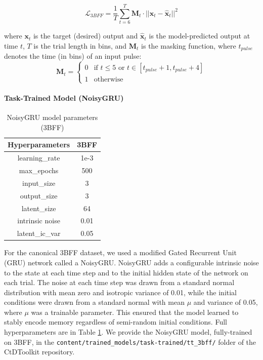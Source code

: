 \documentclass{article}
\begin{document}
$$\mathcal{L}_{3BFF} = \frac{1}{T} \sum_{t=6}^{T} \mathbf{M}_t \cdot ||\mathbf{x}_t - \mathbf{\hat{x}}_t||^2$$

where $\mathbf{x}_t$ is the target (desired) output and $\hat{\mathbf{x}}_t$ is the model-predicted output at time $t$, $T$ is the trial length in bins, and $\mathbf{M}_t$ is the masking function, where $t_{pulse}$ denotes the time (in bins) of an input pulse:
$$\mathbf{M}_t = \begin{cases}
0 & \text{if } t \leq 5 \text{ or } t \in [t_{pulse} + 1, t_{pulse} + 4] \\
1 & \text{otherwise}
\end{cases}$$

\paragraph{Task-Trained Model (NoisyGRU) \label{NoisyGRU}}
\begin{table}[ht]
\centering
\begin{tabular}{|c|c|}
\hline
\textbf{Hyperparameters} & \textbf{3BFF} \\ \hline
learning\_rate &  1e-3  \\ \hline
max\_epochs &  500  \\ \hline
input\_size & 3 \\ \hline
output\_size & 3 \\ \hline
latent\_size & 64 \\ \hline
intrinsic noise &  0.01 \\ \hline
latent\_ic\_var & 0.05  \\ \hline
\end{tabular}
\caption{NoisyGRU model parameters (3BFF)}
\label{table:3bffGRU}
\end{table}
For the canonical 3BFF dataset, we used a modified Gated Recurrent Unit (GRU) network called a NoisyGRU. NoisyGRU adds a configurable intrinsic noise to the state at each time step and to the initial hidden state of the network on each trial. The noise at each time step was drawn from a standard normal distribution with mean zero and isotropic variance of 0.01, while the initial conditions were drawn from a standard normal with mean $\mu$ and variance of 0.05, where $\mu$ was a trainable parameter. This ensured that the model learned to stably encode memory regardless of semi-random initial conditions. Full hyperparameters are in Table \ref{table:3bffGRU}. We provide the NoisyGRU model, fully-trained on 3BFF, in the \texttt{content/trained\_models/task-trained/tt\_3bff/} folder of the CtDToolkit repository.
\end{document}
